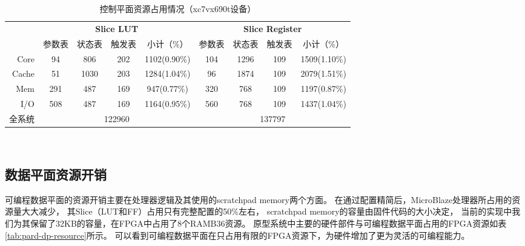 \begin{table}[htb]
  \centering
  \caption{控制平面资源占用情况（xc7vx690t设备）}
  \label{tab:pard-cp-resource}
  \begin{tabular*}{\linewidth}{rcccccccc}
    \toprule[1.5pt]
          & \multicolumn{4}{c}{\textbf{Slice LUT}}   & \multicolumn{4}{c}{\textbf{Slice Register}} \\
          & 参数表 & 状态表 & 触发表 & 小计（\%）    & 参数表 & 状态表 & 触发表 & 小计（\%）       \\
    \midrule[1pt]
     Core &     94 &    806 &    202 & 1102(0.90\%) &    104 &   1296 &    109 & 1509(1.10\%)      \\
    Cache &     51 &   1030 &    203 & 1284(1.04\%) &     96 &   1874 &    109 & 2079(1.51\%)      \\
      Mem &    291 &    487 &    169 &  947(0.77\%) &    320 &    768 &    109 & 1197(0.87\%)      \\
      I/O &    508 &    487 &    169 & 1164(0.95\%) &    560 &    768 &    109 & 1437(1.04\%)      \\
    \hline
   全系统 & \multicolumn{4}{c}{122960}               & \multicolumn{4}{c}{137797}                  \\
    \bottomrule[1.5pt]
  \end{tabular*}\\[2pt]
\end{table}

\subsection{数据平面资源开销}

可编程数据平面的资源开销主要在处理器逻辑及其使用的scratchpad memory两个方面。
在通过配置精简后，MicroBlaze处理器所占用的资源量大大减少，
其Slice（LUT和FF）占用只有完整配置的50\%左右，
scratchpad memory的容量由固件代码的大小决定，
当前的实现中我们为其保留了32KB的容量，在FPGA中占用了8个RAMB36资源。
原型系统中主要的硬件部件与可编程数据平面占用的FPGA资源如表\ref{tab:pard-dp-resource}所示。
可以看到可编程数据平面在只占用有限的FPGA资源下，为硬件增加了更为灵活的可编程能力。

